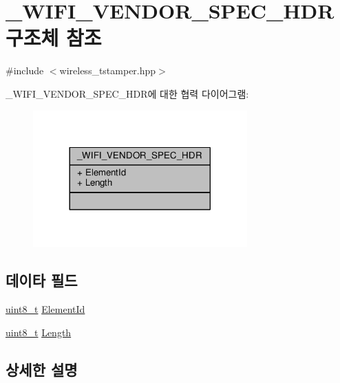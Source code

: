 \hypertarget{struct___w_i_f_i___v_e_n_d_o_r___s_p_e_c___h_d_r}{}\section{\+\_\+\+W\+I\+F\+I\+\_\+\+V\+E\+N\+D\+O\+R\+\_\+\+S\+P\+E\+C\+\_\+\+H\+DR 구조체 참조}
\label{struct___w_i_f_i___v_e_n_d_o_r___s_p_e_c___h_d_r}


{\ttfamily \#include $<$wireless\+\_\+tstamper.\+hpp$>$}



\+\_\+\+W\+I\+F\+I\+\_\+\+V\+E\+N\+D\+O\+R\+\_\+\+S\+P\+E\+C\+\_\+\+H\+D\+R에 대한 협력 다이어그램\+:
\nopagebreak
\begin{figure}[H]
\begin{center}
\leavevmode
\includegraphics[width=233pt]{struct___w_i_f_i___v_e_n_d_o_r___s_p_e_c___h_d_r__coll__graph}
\end{center}
\end{figure}
\subsection*{데이타 필드}
\begin{DoxyCompactItemize}
\item 
\hyperlink{stdint_8h_aba7bc1797add20fe3efdf37ced1182c5}{uint8\+\_\+t} \hyperlink{struct___w_i_f_i___v_e_n_d_o_r___s_p_e_c___h_d_r_a55d82eac4c5510eecdd740196a0806c8}{Element\+Id}
\item 
\hyperlink{stdint_8h_aba7bc1797add20fe3efdf37ced1182c5}{uint8\+\_\+t} \hyperlink{struct___w_i_f_i___v_e_n_d_o_r___s_p_e_c___h_d_r_a2b1ba85fe7425ab62c629e2d39646b24}{Length}
\end{DoxyCompactItemize}


\subsection{상세한 설명}


